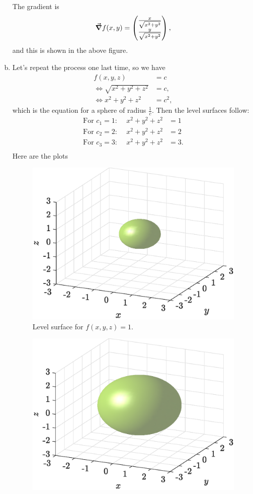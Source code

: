 \documentclass[12pt]{article} %
\begin{document}
\begin{solution}
\begin{enumerate}[(a)]
    The gradient is
    \[
    \boldsymbol{\vec{\nabla}} f(x,y) = \begin{pmatrix} \frac{x}{\sqrt{x^2+y^2}} \\ \frac{y}{\sqrt{x^2+y^2}} \end{pmatrix},
    \]
    and this is shown in the above figure.

    \item Let's repeat the process one last time, so we have
    \begin{align*}
            f(x,y,z)&=c\\
        \iff \sqrt{x^2+y^2+z^2}&= c,\\
        \iff x^2+y^2+z^2 &= c^2,
    \end{align*}
    which is the equation for a sphere of radius $\frac{1}{c}$.  Then the level surfaces follow:
        \begin{align*}
        \textrm{For $c_1=1$:~}\quad x^2+y^2+z^2&=1\\
        \textrm{For $c_2=2$:~}\quad x^2+y^2+z^2&=2\\
        \textrm{For $c_3=3$:~}\quad x^2+y^2+z^2&=3.\\
    \end{align*}
    Here are the plots
    \begin{figure}[H]
        \centering
        \includegraphics[width=.65\textwidth]{figures/7c_1}
        \caption{Level surface for $f(x,y,z)=1$.}
    \end{figure}
    \begin{figure}[H]
        \centering
        \includegraphics[width=.65\textwidth]{figures/7c_2}

\end{figure}
\end{enumerate}
\end{solution}
\end{document}
